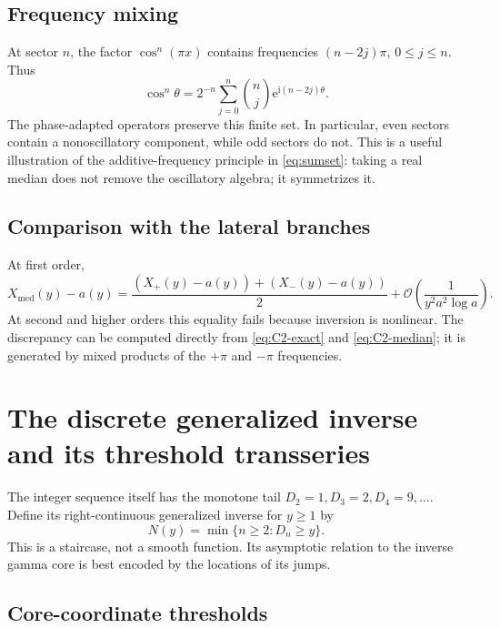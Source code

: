 \documentclass[11pt,a4paper]{article}
\numberwithin{equation}{section}
\theoremstyle{definition}
\theoremstyle{remark}
\newcommand{\e}{\mathrm e}
\newcommand{\ii}{\mathrm i}
\newcommand{\Ord}{\mathcal O}
\newcommand{\med}{\mathrm{med}}
\begin{document}
\subsection{Frequency mixing}

At sector $n$, the factor $\cos^n(\pi x)$ contains frequencies
$(n-2j)\pi$, $0\le j\le n$.  Thus
\begin{equation}\label{eq:cos-power}
 \cos^n\theta=2^{-n}\sum_{j=0}^{n}\binom nj
 \e^{\ii(n-2j)\theta}.
\end{equation}
The phase-adapted operators preserve this finite set.  In particular, even
sectors contain a nonoscillatory component, while odd sectors do not.  This
is a useful illustration of the additive-frequency principle in
\cref{eq:sumset}: taking a real median does not remove the oscillatory
algebra; it symmetrizes it.

\subsection{Comparison with the lateral branches}

At first order,
\begin{equation}\label{eq:median-average-first}
 X_{\med}(y)-a(y)
 =\frac{(X_+(y)-a(y))+(X_-(y)-a(y))}{2}
 +\Ord\!\left(\frac1{y^2a^2\log a}\right).
\end{equation}
At second and higher orders this equality fails because inversion is
nonlinear.  The discrepancy can be computed directly from
\eqref{eq:C2-exact} and \eqref{eq:C2-median}; it is generated by mixed
products of the $+\pi$ and $-\pi$ frequencies.

\section{The discrete generalized inverse and its threshold transseries}
\label{sec:discrete-inverse}

The integer sequence itself has the monotone tail
$D_2=1,D_3=2,D_4=9,\ldots$.  Define its right-continuous generalized inverse
for $y\ge1$ by
\begin{equation}\label{eq:N-def}
 N(y)=\min\{n\ge2:D_n\ge y\}.
\end{equation}
This is a staircase, not a smooth function.  Its asymptotic relation to the
inverse gamma core is best encoded by the locations of its jumps.

\subsection{Core-coordinate thresholds}
\end{document}
